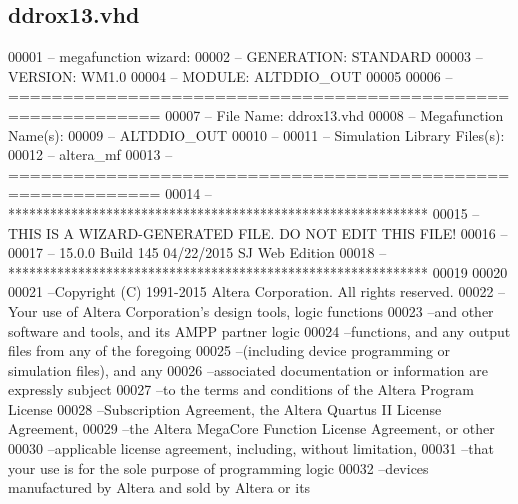 \subsection{ddrox13.\+vhd}
\label{ddrox13_8vhd_source}

\begin{DoxyCode}
00001 \textcolor{keyword}{-- megafunction wizard: %
00002 \textcolor{keyword}{-- GENERATION: STANDARD}
00003 \textcolor{keyword}{-- VERSION: WM1.0}
00004 \textcolor{keyword}{-- MODULE: ALTDDIO\_OUT }
00005 
00006 \textcolor{keyword}{-- ============================================================}
00007 \textcolor{keyword}{-- File Name: ddrox13.vhd}
00008 \textcolor{keyword}{-- Megafunction Name(s):}
00009 \textcolor{keyword}{--          ALTDDIO\_OUT}
00010 \textcolor{keyword}{--}
00011 \textcolor{keyword}{-- Simulation Library Files(s):}
00012 \textcolor{keyword}{--          altera\_mf}
00013 \textcolor{keyword}{-- ============================================================}
00014 \textcolor{keyword}{-- ************************************************************}
00015 \textcolor{keyword}{-- THIS IS A WIZARD-GENERATED FILE. DO NOT EDIT THIS FILE!}
00016 \textcolor{keyword}{--}
00017 \textcolor{keyword}{-- 15.0.0 Build 145 04/22/2015 SJ Web Edition}
00018 \textcolor{keyword}{-- ************************************************************}
00019 
00020 
00021 \textcolor{keyword}{--Copyright (C) 1991-2015 Altera Corporation. All rights reserved.}
00022 \textcolor{keyword}{--Your use of Altera Corporation's design tools, logic functions }
00023 \textcolor{keyword}{--and other software and tools, and its AMPP partner logic }
00024 \textcolor{keyword}{--functions, and any output files from any of the foregoing }
00025 \textcolor{keyword}{--(including device programming or simulation files), and any }
00026 \textcolor{keyword}{--associated documentation or information are expressly subject }
00027 \textcolor{keyword}{--to the terms and conditions of the Altera Program License }
00028 \textcolor{keyword}{--Subscription Agreement, the Altera Quartus II License Agreement,}
00029 \textcolor{keyword}{--the Altera MegaCore Function License Agreement, or other }
00030 \textcolor{keyword}{--applicable license agreement, including, without limitation, }
00031 \textcolor{keyword}{--that your use is for the sole purpose of programming logic }
00032 \textcolor{keyword}{--devices manufactured by Altera and sold by Altera or its }
}
\end{DoxyCode}
